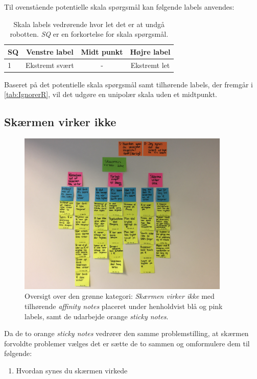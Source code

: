 \noindent
%
Til ovenstående potentielle skala spørgsmål kan følgende labels anvendes:
%
\begin{table}[H]
	\centering
	\begin{tabular}{l|c|c|c}
		SQ     & Venstre label & Midt punkt & Højre label \\\hline
		1   & Ekstremt svært & - & Ekstremt let                 
	\end{tabular}
\caption{Skala labels vedrørende hvor let det er at undgå robotten. \textit{SQ} er en forkortelse for skala spørgsmål.}
	\label{tab:IgnorerR} 
\end{table}
\noindent
%
Baseret på det potentielle skala spørgsmål samt tilhørende labels, der fremgår i \autoref{tab:IgnorerR}, vil det udgøre en unipolær skala uden et midtpunkt. 
%
\newpage
\subsection{Skærmen virker ikke}
\label{ParametreSkaermenVirkerIkke}
%
\begin{figure}[H]
\centering
\includegraphics[width = 0.9\textwidth]{Figure/AffinityDiagram/SkaermenVirkerIkke} 
\caption{Oversigt over den grønne kategori: \textit{Skærmen virker ikke} med tilhørende \textit{affinity notes} placeret under henholdvist blå og pink labels, samt de udarbejde orange \textit{sticky notes}.}
\label{fig:AFSkaermVirkerIkke}
\end{figure}
\noindent
%
Da de to orange \textit{sticky notes} vedrører den samme problemstilling, at skærmen forvoldte problemer vælges det er sætte de to sammen og omformulere dem til følgende:\blankline
%
\begin{enumerate}
  \item Hvordan synes du skærmen virkede\blankline
\end{enumerate}
